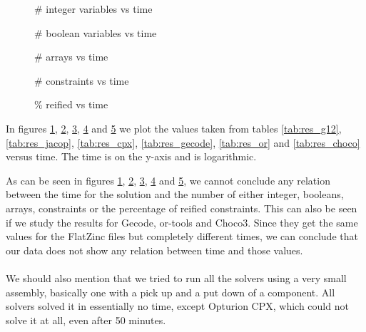 \begin{figure}[H]
\centering

\caption{\# integer variables vs time}
\label{fig:int_vs_time}
\end{figure}

\begin{figure}[H]
\centering

\caption{\# boolean variables vs time}
\label{fig:bool_vs_time}
\end{figure}

\begin{figure}[H]
\centering

\caption{\# arrays vs time}
\label{fig:arr_vs_time}
\end{figure}

\begin{figure}[H]
\centering

\caption{\# constraints vs time}
\label{fig:const_vs_time}
\end{figure}

\begin{figure}[H]
\centering

\caption{\% reified vs time}
\label{fig:reif_vs_time}
\end{figure}

In figures \ref{fig:int_vs_time}, \ref{fig:bool_vs_time}, \ref{fig:arr_vs_time}, \ref{fig:const_vs_time} and \ref{fig:reif_vs_time} we plot the values taken from tables \ref{tab:res_g12}, \ref{tab:res_jacop}, \ref{tab:res_cpx}, \ref{tab:res_gecode}, \ref{tab:res_or} and \ref{tab:res_choco} versus time. The time is on the y-axis and is logarithmic.

As can be seen in figures \ref{fig:int_vs_time}, \ref{fig:bool_vs_time}, \ref{fig:arr_vs_time}, \ref{fig:const_vs_time} and \ref{fig:reif_vs_time}, we cannot conclude any relation between the time for the solution and the number of either integer, booleans, arrays, constraints or the percentage of reified constraints. This can also be seen if we study the results for Gecode, or-tools and Choco3. Since they get the same values for the FlatZinc files but completely different times, we can conclude that our data does not show any relation between time and those values.
\\\\
We should also mention that we tried to run all the solvers using a very small assembly, basically one with a pick up and a put down of a component. All solvers solved it in essentially no time, except Opturion CPX, which could not solve it at all, even after 50 minutes.
